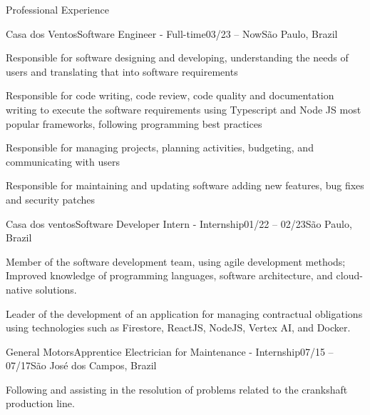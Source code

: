 \documentclass[]{template}
\begin{document}
\begin{section}{Professional Experience}
 \begin{subsection}{Casa dos Ventos}{Software Engineer - Full-time}{03/23 -- Now}{São Paulo, Brazil}
     \item Responsible for software designing and developing, understanding the needs of users and translating that into software requirements
     \item Responsible for code writing, code review, code quality and documentation writing to execute the software requirements using Typescript and Node JS most popular frameworks, following programming best practices
     \item Responsible for managing projects, planning activities, budgeting, and communicating with users
     \item Responsible for maintaining and updating software adding new features, bug fixes and security patches
 \end{subsection}
 
 \begin{subsection}{Casa dos ventos}{Software Developer Intern - Internship}{01/22 -- 02/23}{São Paulo, Brazil}
     \item Member of the software development team, using agile development methods; Improved knowledge of programming languages, software architecture, and cloud-native solutions.
     \item Leader of the development of an application for managing contractual obligations using technologies such as Firestore, ReactJS, NodeJS, Vertex AI, and Docker.
 \end{subsection}
 
 \begin{subsection}{General Motors}{Apprentice Electrician for Maintenance - Internship}{07/15 -- 07/17}{São José dos Campos, Brazil}
     \item Following and assisting in the resolution of problems related to the crankshaft production line.
 \end{subsection}
 
\end{section}



\end{document}
